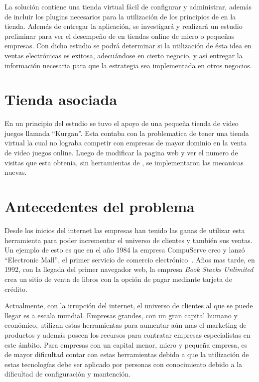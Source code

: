 La solución contiene una tienda virtual fácil de configurar y administrar,
además de incluir los plugins necesarios para la utilización de los principios
de {\GAM} en la tienda.
Además de entregar la aplicación, se investigará y realizará un estudio preliminar
para ver el desempeño de {\GAM} en tiendas online de micro o pequeñas empresas.
Con dicho estudio se podrá determinar si la utilización de ésta idea en ventas
electrónicas es exitosa, adecuándose en cierto negocio,
y así entregar la información necesaria para que la estrategia sea implementada
en otros negocios.

\section{Tienda asociada}

En un principio del estudio se tuvo el apoyo de una pequeña tienda de video juegos
llamada ``Kurgan''. Esta contaba con la problematica de tener una tienda virtual
la cual no lograba competir con empresas de mayor dominio en la venta de video juegos
online. Luego de modificar la pagina web y ver el numero de visitas que esta obtenia, sin
herramientas de {\GAM}, se implementaron las mecanicas nuevas.

\section{Antecedentes del problema}

Desde los inicios del internet las empresas han tenido las ganas de utilizar
esta herramienta para poder incrementar el universo de clientes y también sus
ventas.
Un ejemplo de esto es que en el año 1984 la empresa CompuServe creo y lanzó
``Electronic Mall'', el primer servicio de comercio electrónico~\cite{Def:1}.
Años mas tarde, en 1992, con la llegada del primer navegador web, la empresa
\emph{Book Stacks Unlimited} crea un sitio de venta de libros con la opción de
pagar mediante tarjeta de crédito.

Actualmente, con la irrupción del internet, el universo de clientes al que se
puede llegar es a escala mundial.
Empresas grandes, con un gran capital humano y económico, utilizan estas
herramientas para aumentar aún mas el marketing de productos y además poseen los
recursos para contratar empresas especialistas en este ámbito.
Para empresas con un capital menor, micro y pequeña empresa, es de mayor
dificultad contar con estas herramientas debido a que la utilización de estas
tecnologías debe ser aplicado por personas con conocimiento debido a la dificultad
de configuración y mantención.


